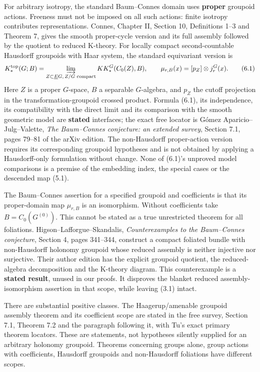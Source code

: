 \documentclass[
  11pt,
]{article}
\begin{document}
For arbitrary isotropy, the standard Baum--Connes domain uses
\textbf{proper} groupoid actions. Freeness must not be imposed on all
such actions: finite isotropy contributes representations. Connes,
Chapter II, Section 10, Definitions 1--3 and Theorem 7, gives the smooth
proper-cycle version and its full assembly followed by the quotient to
reduced K-theory. For locally compact second-countable Hausdorff
groupoids with Haar system, the standard equivariant version is \[
 K_*^{\mathrm{top}}(G;B)=\varinjlim_{Z\subset\underline EG,\,Z/G\text{ compact}}
 KK_*^G(C_0(Z),B),\qquad
 \mu_{r,B}(x)=[p_Z]\otimes j_r^G(x).
 \tag{6.1}
\] Here \(Z\) is a proper \(G\)-space, \(B\) a separable \(G\)-algebra,
and \(p_Z\) the cutoff projection in the transformation-groupoid crossed
product. Formula (6.1), its independence, its compatibility with the
direct limit and its comparison with the smooth geometric model are
\textbf{stated} interfaces; the exact free locator is Gómez
Aparicio--Julg--Valette, \emph{The Baum--Connes conjecture: an extended
survey}, Section 7.1, pages 79--81 of the arXiv edition. The
non-Hausdorff proper-action version requires its corresponding groupoid
hypotheses and is not obtained by applying a Hausdorff-only formulation
without change. None of (6.1)'s unproved model comparisons is a premise
of the embedding index, the special cases or the descended map (5.1).

The Baum--Connes assertion for a specified groupoid and coefficients is
that its proper-domain map \(\mu_{r,B}\) is an isomorphism. Without
coefficients take \(B=C_0(G^{(0)})\). This cannot be stated as a true
unrestricted theorem for all foliations. Higson--Lafforgue--Skandalis,
\emph{Counterexamples to the Baum--Connes conjecture}, Section 4, pages
341--344, construct a compact foliated bundle with non-Hausdorff
holonomy groupoid whose reduced assembly is neither injective nor
surjective. Their author edition has the explicit groupoid quotient, the
reduced-algebra decomposition and the K-theory diagram. This
counterexample is a \textbf{stated result}, unused in our proofs. It
disproves the blanket reduced assembly-isomorphism assertion in that
scope, while leaving (3.1) intact.

There are substantial positive classes. The Haagerup/amenable groupoid
assembly theorem and its coefficient scope are stated in the free
survey, Section 7.1, Theorem 7.2 and the paragraph following it, with
Tu's exact primary theorem locators. These are statements, not
hypotheses silently supplied for an arbitrary holonomy groupoid.
Theorems concerning groups alone, group actions with coefficients,
Hausdorff groupoids and non-Hausdorff foliations have different scopes.
\end{document}
